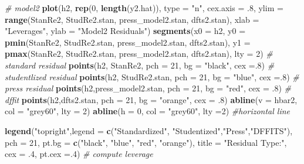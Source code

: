 \documentclass[]{article}
\newenvironment{Shaded}{\begin{snugshade}}{\end{snugshade}}
\newcommand{\KeywordTok}[1]{\textcolor[rgb]{0.13,0.29,0.53}{\textbf{#1}}}
\newcommand{\DataTypeTok}[1]{\textcolor[rgb]{0.13,0.29,0.53}{#1}}
\newcommand{\DecValTok}[1]{\textcolor[rgb]{0.00,0.00,0.81}{#1}}
\newcommand{\StringTok}[1]{\textcolor[rgb]{0.31,0.60,0.02}{#1}}
\newcommand{\CommentTok}[1]{\textcolor[rgb]{0.56,0.35,0.01}{\textit{#1}}}
\newcommand{\NormalTok}[1]{#1}
\begin{document}
\begin{Shaded}
\begin{Highlighting}[]
\CommentTok{# model2}
\KeywordTok{plot}\NormalTok{(h2, }\KeywordTok{rep}\NormalTok{(}\DecValTok{0}\NormalTok{, }\KeywordTok{length}\NormalTok{(y2.hat)), }\DataTypeTok{type =} \StringTok{"n"}\NormalTok{, }\DataTypeTok{cex.axis =}\NormalTok{ .}\DecValTok{8}\NormalTok{,}
     \DataTypeTok{ylim =} \KeywordTok{range}\NormalTok{(StanRe2, StudRe2.stan, press_model2.stan, dfts2.stan),}
     \DataTypeTok{xlab =} \StringTok{"Leverages"}\NormalTok{, }\DataTypeTok{ylab =} \StringTok{"Model2 Residuals"}\NormalTok{) }
\KeywordTok{segments}\NormalTok{(}\DataTypeTok{x0 =}\NormalTok{ h2,}
         \DataTypeTok{y0 =} \KeywordTok{pmin}\NormalTok{(StanRe2, StudRe2.stan, press_model2.stan, dfts2.stan), }
         \DataTypeTok{y1 =} \KeywordTok{pmax}\NormalTok{(StanRe2, StudRe2.stan, press_model2.stan, dfts2.stan),}
         \DataTypeTok{lty =} \DecValTok{2}\NormalTok{)}
 \CommentTok{# standard residual}
\KeywordTok{points}\NormalTok{(h2, StanRe2, }\DataTypeTok{pch =} \DecValTok{21}\NormalTok{, }\DataTypeTok{bg =} \StringTok{"black"}\NormalTok{, }\DataTypeTok{cex =}\NormalTok{.}\DecValTok{8}\NormalTok{)}
\CommentTok{# studentlized residual}
\KeywordTok{points}\NormalTok{(h2, StudRe2.stan, }\DataTypeTok{pch =} \DecValTok{21}\NormalTok{, }\DataTypeTok{bg =} \StringTok{"blue"}\NormalTok{, }\DataTypeTok{cex =}\NormalTok{.}\DecValTok{8}\NormalTok{) }
\CommentTok{# press residual }
\KeywordTok{points}\NormalTok{(h2,press_model2.stan, }\DataTypeTok{pch =} \DecValTok{21}\NormalTok{, }\DataTypeTok{bg =} \StringTok{"red"}\NormalTok{, }\DataTypeTok{cex =}\NormalTok{ .}\DecValTok{8}\NormalTok{)}
\CommentTok{# dffit}
\KeywordTok{points}\NormalTok{(h2,dfts2.stan, }\DataTypeTok{pch =} \DecValTok{21}\NormalTok{, }\DataTypeTok{bg =} \StringTok{"orange"}\NormalTok{, }\DataTypeTok{cex =}\NormalTok{ .}\DecValTok{8}\NormalTok{) }
\KeywordTok{abline}\NormalTok{(}\DataTypeTok{v =}\NormalTok{ hbar2, }\DataTypeTok{col =} \StringTok{"grey60"}\NormalTok{, }\DataTypeTok{lty =} \DecValTok{2}\NormalTok{)}
\KeywordTok{abline}\NormalTok{(}\DataTypeTok{h =} \DecValTok{0}\NormalTok{, }\DataTypeTok{col =} \StringTok{"grey60"}\NormalTok{, }\DataTypeTok{lty =}\DecValTok{2}\NormalTok{) }\CommentTok{#horizontal line}

\KeywordTok{legend}\NormalTok{(}\StringTok{"topright"}\NormalTok{,}\DataTypeTok{legend =} \KeywordTok{c}\NormalTok{(}\StringTok{"Standardized"}\NormalTok{, }\StringTok{"Studentized"}\NormalTok{,}\StringTok{"Press"}\NormalTok{,}\StringTok{"DFFITS"}\NormalTok{), }
       \DataTypeTok{pch =} \DecValTok{21}\NormalTok{,}
       \DataTypeTok{pt.bg =} \KeywordTok{c}\NormalTok{(}\StringTok{"black"}\NormalTok{, }\StringTok{"blue"}\NormalTok{, }\StringTok{"red"}\NormalTok{, }\StringTok{"orange"}\NormalTok{),}
       \DataTypeTok{title =} \StringTok{"Residual Type:"}\NormalTok{, }\DataTypeTok{cex =}\NormalTok{ .}\DecValTok{4}\NormalTok{, }\DataTypeTok{pt.cex =}\NormalTok{.}\DecValTok{4}\NormalTok{) }\CommentTok{# compute leverage}


\end{Highlighting}
\end{Shaded}
\end{document}

